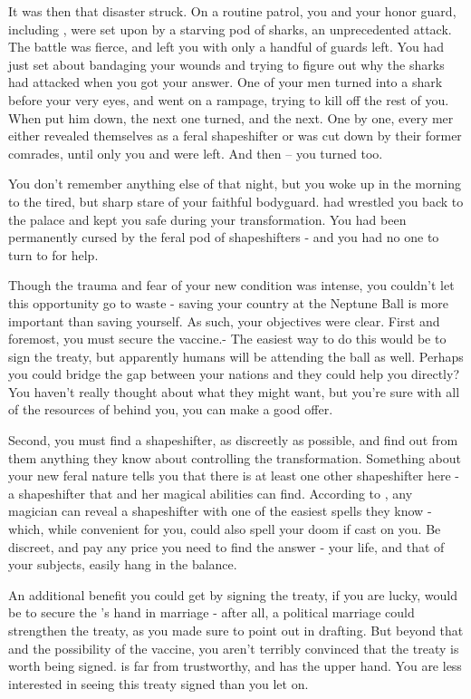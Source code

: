 \documentclass[char]{NeptuneBall}
\begin{document}
It was then that disaster struck. On a routine patrol, you and your honor guard, including \cBodyguard{}, were set upon by a starving pod of sharks, an unprecedented attack. The battle was fierce, and left you with only a handful of guards left. You had just set about bandaging your wounds and trying to figure out why the sharks had attacked when you got your answer. One of your men turned into a shark before your very eyes, and went on a rampage, trying to kill off the rest of you. When \cBodyguard{} put him down, the next one turned, and the next. One by one, every mer either revealed themselves as a feral shapeshifter or was cut down by their former comrades, until only you and \cBodyguard{} were left. And then -- you turned too.

You don't remember anything else of that night, but you woke up in the morning to the tired, but sharp stare of your faithful bodyguard. \cBodyguard{\They} had wrestled you back to the palace and kept you safe during your transformation. You had been permanently cursed by the feral pod of shapeshifters - and you had no one to turn to for help.

Though the trauma and fear of your new condition was intense, you couldn't let this opportunity go to waste - saving your country at the Neptune Ball is more important than saving yourself. As such, your objectives were clear. First and foremost, you must secure the \ppolio{} vaccine.- The easiest way to do this would be to sign the treaty, but apparently humans will be attending the ball as well. Perhaps you could bridge the gap between your nations and they could help you directly? You haven't really thought about what they might want, but you're sure with all of the resources of \pPacifica{} behind you, you can make a good offer. 

Second, you must find a shapeshifter, as discreetly as possible, and find out from them anything they know about controlling the transformation. Something about your new feral nature tells you that there is at least one other shapeshifter here - a shapeshifter that \cBodyguard{} and her magical abilities can find. According to \cBodyguard{}, any magician can reveal a shapeshifter with one of the easiest spells they know - which, while convenient for you, could also spell your doom if cast on you. Be discreet, and pay any price you need to find the answer - your life, and that of your subjects, easily hang in the balance.

An additional benefit you could get by signing the treaty, if you are lucky, would be to secure the \cPrincess{\prince}'s hand in marriage - after all, a political marriage could strengthen the treaty, as you made sure to point out in drafting. But beyond that and the possibility of the vaccine, you aren't terribly convinced that the treaty is worth being signed. \pAtlantis{} is far from trustworthy, and \pPacifica{} has the upper hand. You are less interested in seeing this treaty signed than you let on.
\end{document}

